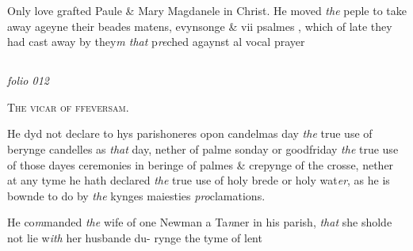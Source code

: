 \documentclass[12pt, a4paper]{book}
\begin{document}
 
				\marginpar[\vspace{0.5cm}{\textcolor{Gray}{n}}]{}
			
		\ifthenelse{\isodd{\thepage}}
		{\reversemarginpar}
		{\normalmarginpar}
		Only love grafted Paule \& Mary Magdanele in Christ.
 He moved \textit{the} peple to take away ageyne their beades matens, evynsonge \& vii psalmes
			, which
 of late they had cast away by they\textit{m that} p\textit{re}ched agaynst al vocal
 prayer


            
            
\dotfill
					  \subsection*{}

\textit{folio 012}


            
            	
				\begin{center} \begin{large} {\scshape The vicar of ffeversam.} \end{large} \end{center}
			


				\marginpar[\vspace{0.5cm}{\textcolor{Gray}{ceremonies n}}]{}
			 
				\marginpar[\vspace{0.5cm}{\textcolor{Gray}{1}}]{}
			
		\ifthenelse{\isodd{\thepage}}
		{\reversemarginpar}
		{\normalmarginpar}
		He dyd not declare to hys parishoneres opon candelmas day
 \textit{the} true use of berynge candelles as \textit{that} day, nether of palme
 sonday or goodfriday \textit{the} true use of those dayes ceremonies
 in beringe of palmes \& crepynge of the crosse, nether at
 any tyme he hath declared \textit{the} true use of holy brede or
 holy wat\textit{er}, as he is bownde to do by \textit{the} kynges maiesties
 \textit{pro}clamations.

				\marginpar[\vspace{0.5cm}{\textcolor{Gray}{lent}}]{}
			
				\marginpar[\vspace{0.5cm}{\textcolor{Gray}{2}}]{}
			
		\ifthenelse{\isodd{\thepage}}
		{\reversemarginpar}
		{\normalmarginpar}
		He co\textit{m}manded \textit{the} wife of one Newman a Ta\textit{n}ner in
 his parish, \textit{that} she sholde not lie w\textit{ith} her husbande du-
 rynge the tyme of lent
\end{document}
